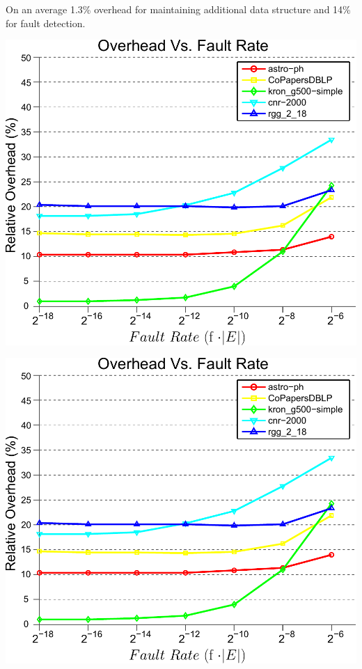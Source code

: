 \color{dpg} On an average 1.3\% overhead for maintaining additional data structure and 14\%
for fault detection.
\lyxframeend{}

\centering
\includegraphics[height=.75\textheight]{plots/plot_overhead_fault-inked}

\lyxframeend{}


\centering
\includegraphics[height=.75\textheight]{plots/plot_overhead_fault-inked}

